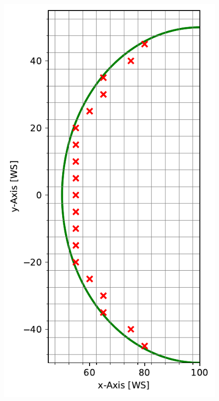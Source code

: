 \begin{figure}[h]
  \includegraphics[width=\linewidth]{res/intersection.pdf}
  \endminipage\hfill

\end{figure}
